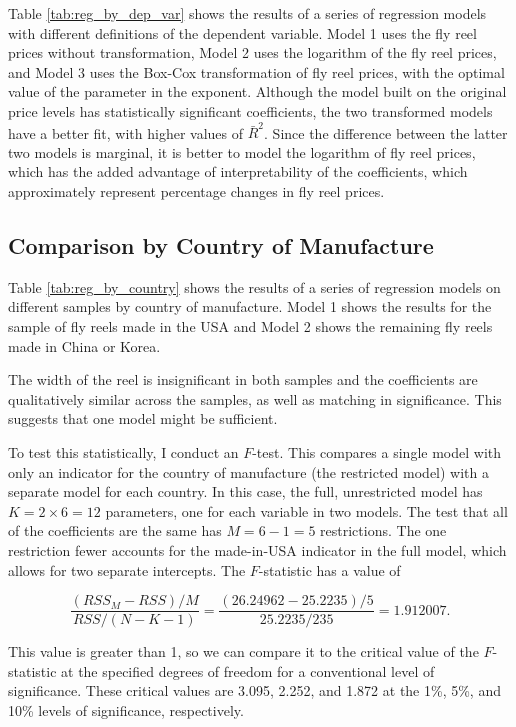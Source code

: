 \documentclass[11pt]{paper}
\begin{document}
Table \ref{tab:reg_by_dep_var} shows the results of 
a series of regression models with different definitions of the dependent variable.
Model 1 uses the fly reel prices without transformation, 
Model 2 uses the logarithm of the fly reel prices, 
and Model 3 uses the Box-Cox transformation of fly reel prices, 
with the optimal value of the parameter in the exponent.
% 
Although the model built on the original price levels
has statistically significant coefficients, 
the two transformed models have a better fit, 
with higher values of $\bar{R}^2$. 
Since the difference between the latter two models is marginal, 
it is better to model the logarithm of fly reel prices, 
which has the added advantage of interpretability 
of the coefficients, 
which approximately represent percentage changes in fly reel prices. 



\pagebreak
\subsection{Comparison by Country of Manufacture}

Table \ref{tab:reg_by_country} shows the results of 
a series of regression models 
on different samples by country of manufacture.
Model 1 shows the results for the sample of fly reels made in the USA
and Model 2 shows the remaining fly reels made in China or Korea.



The width of the reel is insignificant in both samples
and the coefficients are qualitatively similar across the samples, as well as matching in significance. 
This suggests that one model might be sufficient. 

To test this statistically, I conduct an $F$-test. 
This compares a single model with only an
indicator for the country of manufacture
(the restricted model)
with a separate model for each country.
In this case, the full, unrestricted model has 
$K = 2\times6 = 12$ parameters, one for each variable in two models. 
The test that all of the coefficients are the same has 
$M = 6 - 1 = 5$
restrictions. 
The one restriction fewer accounts for the made-in-USA indicator
in the full model, 
which allows for two separate intercepts. 
% 
The $F$-statistic has a value of 

$$ 
\frac{(RSS_M - RSS)/M}{RSS/(N - K - 1)} = \frac{(26.24962 - 25.2235)/5}{25.2235/235} = 1.912007. 
$$

This value is greater than 1, so we can compare it to the critical value
of the $F$-statistic at the specified degrees of freedom for
a conventional level of significance.
These critical values are 
3.095, 2.252, and 1.872
at the 1\%, 5\%, and 10\%
levels of significance, respectively.
\end{document}
